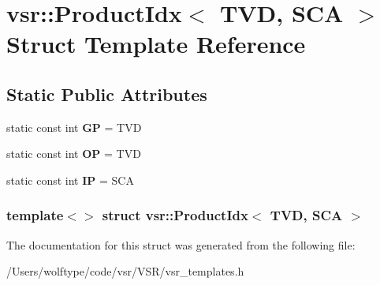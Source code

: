 \hypertarget{structvsr_1_1_product_idx_3_01_t_v_d_00_01_s_c_a_01_4}{\section{vsr\-:\-:Product\-Idx$<$ T\-V\-D, S\-C\-A $>$ Struct Template Reference}
\label{structvsr_1_1_product_idx_3_01_t_v_d_00_01_s_c_a_01_4}
}
\subsection*{Static Public Attributes}
\begin{DoxyCompactItemize}
\item 
\hypertarget{structvsr_1_1_product_idx_3_01_t_v_d_00_01_s_c_a_01_4_a7b6dd0d5838a2566863d61c21d45b521}{static const int {\bfseries G\-P} = T\-V\-D}\label{structvsr_1_1_product_idx_3_01_t_v_d_00_01_s_c_a_01_4_a7b6dd0d5838a2566863d61c21d45b521}

\item 
\hypertarget{structvsr_1_1_product_idx_3_01_t_v_d_00_01_s_c_a_01_4_a5d53ced2f594528a0bbe28516b13b319}{static const int {\bfseries O\-P} = T\-V\-D}\label{structvsr_1_1_product_idx_3_01_t_v_d_00_01_s_c_a_01_4_a5d53ced2f594528a0bbe28516b13b319}

\item 
\hypertarget{structvsr_1_1_product_idx_3_01_t_v_d_00_01_s_c_a_01_4_a74a73b5e35a33bc5abed785aac2bfcd7}{static const int {\bfseries I\-P} = S\-C\-A}\label{structvsr_1_1_product_idx_3_01_t_v_d_00_01_s_c_a_01_4_a74a73b5e35a33bc5abed785aac2bfcd7}

\end{DoxyCompactItemize}
\subsubsection*{template$<$$>$ struct vsr\-::\-Product\-Idx$<$ T\-V\-D, S\-C\-A $>$}



The documentation for this struct was generated from the following file\-:\begin{DoxyCompactItemize}
\item 
/\-Users/wolftype/code/vsr/\-V\-S\-R/vsr\-\_\-templates.\-h\end{DoxyCompactItemize}
